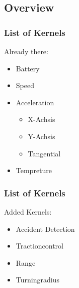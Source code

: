\documentclass{beamer}
\begin{document}
\subsection{Overview}
\begin{frame} %
  \frametitle{List of Kernels} %
  Already there:
  \begin{itemize}
   \item Battery
   \item Speed
   \item Acceleration
   \begin{itemize}
    \item X-Achsis
    \item Y-Achsis
    \item Tangential
   \end{itemize}
   \item Tempreture
  \end{itemize}
\end{frame}
\begin{frame}
    \frametitle{List of Kernels}
    Added Kernels:
    \begin{itemize}
     \item Accident Detection
     \item Tractioncontrol
     \item Range
     \item Turningradius
    \end{itemize}
\end{frame}
\end{document}
